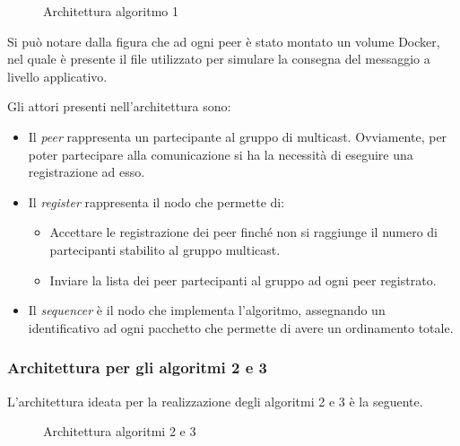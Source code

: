 \documentclass[acmtog]{acmart}
\begin{document}
\begin{figure}[ht!]
\centering
{}
\caption{Architettura algoritmo 1}
\end{figure} 

Si può notare dalla figura che ad ogni peer è stato montato un volume Docker, nel quale è presente il file utilizzato per simulare la consegna del messaggio a livello applicativo. 

Gli attori presenti nell'architettura sono:
\begin{itemize}
\item Il \textit{peer} rappresenta un partecipante al gruppo di multicast. Ovviamente, per poter partecipare alla comunicazione si ha la necessità di eseguire una registrazione ad esso.
\item Il \textit{register} rappresenta il nodo che permette di:
\begin{itemize}
\item Accettare le registrazione dei peer finché non si raggiunge il numero di partecipanti stabilito al gruppo multicast.
\item Inviare la lista dei peer partecipanti al gruppo ad ogni peer registrato.
\end{itemize}
\item Il \textit{sequencer} è il nodo che implementa l'algoritmo, assegnando un identificativo ad ogni pacchetto che permette di avere un ordinamento totale.
\end{itemize}

\subsubsection{Architettura per gli algoritmi 2 e 3}
L'architettura ideata per la realizzazione degli algoritmi 2 e 3 è la seguente.
\begin{figure}[ht!]
\centering
{}
\caption{Architettura algoritmi 2 e 3}
\end{figure}
\end{document}
